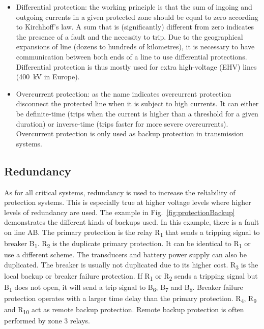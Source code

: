 \begin{itemize}
    \item Differential protection: the working principle is that the sum of ingoing and outgoing currents in a given protected zone should be equal to zero according to Kirchhoff's law. A sum that is (significantly) different from zero indicates the presence of a fault and the necessity to trip. Due to the geographical expansions of line (dozens to hundreds of kilometres), it is necessary to have communication between both ends of a line to use differential protections. Differential protection is thus mostly used for extra high-voltage (EHV) lines (400~kV in Europe).

    \item Overcurrent protection: as the name indicates overcurrent protection disconnect the protected line when it is subject to high currents. It can either be definite-time (trips when the current is higher than a threshold for a given duration) or inverse-time (trips faster for more severe overcurrents). Overcurrent protection is only used as backup protection in transmission systems.
\end{itemize}

\subsection{Redundancy}

As for all critical systems, redundancy is used to increase the reliability of protection systems. This is especially true at higher voltage levels where higher levels of redundancy are used. The example in Fig.~\ref{fig:protectionBackup} demonstrates the different kinds of backups used. In this example, there is a fault on line AB. The primary protection is the relay R\textsubscript{1} that sends a tripping signal to breaker B\textsubscript{1}. R\textsubscript{2} is the duplicate primary protection. It can be identical to R\textsubscript{1} or use a different scheme. The transducers and battery power supply can also be duplicated. The breaker is usually not duplicated due to its higher cost. R\textsubscript{3} is the local backup or breaker failure protection. If R\textsubscript{1} or R\textsubscript{2} sends a tripping signal but B\textsubscript{1} does not open, it will send a trip signal to B\textsubscript{6}, B\textsubscript{7} and B\textsubscript{8}. Breaker failure protection operates with a larger time delay than the primary protection. R\textsubscript{4}, R\textsubscript{9} and R\textsubscript{10} act as remote backup protection. Remote backup protection is often performed by zone 3 relays.

